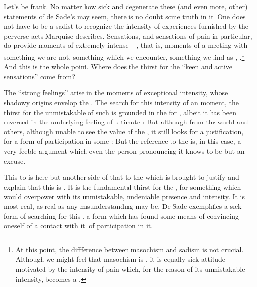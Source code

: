 {\subpa Let's be frank.  No matter how sick and degenerate these (and
even more, other) statements of de Sade's may seem, there is no doubt
some truth in it.  One does not have to be a sadist to recognize the
intensity of experiences furnished by the perverse acts Marquise
describes.  Sensations, and sensations of pain in particular, do
provide moments of extremely intense  --
, that is, moments of a meeting with something we are
not, something which we encounter, something we find as , .\footnote{At this point, the
diffference between masochism and sadism is not crucial.  Although we
might feel that masochism is , it is equally sick
attitude motivated by the intensity of pain which, for the reason of
its unmistakable intensity, becomes a .} And this is the whole point.  Where does the thirst for the
``keen and active sensations'' come from?

The ``strong
feelings'' arise in the moments of exceptional intensity, whose
shadowy origins envelop the .  The search for this intensity
of an  moment, the thirst for the unmistakable 
of such  is grounded in the  for
, albeit it has been reversed in the underlying
feeling of ultimate :
But although  from the world and others,
although unable to see the value of the 
, it still looks for a justification, for a form of
participation in some :
But the reference to the  is, in this
case, a very feeble argument which even the person pronouncing it
knows to be but an excuse.



\pa 
This  to  is here but another side of that 
 to the  which is brought to justify and 
explain that this is .
It is the fundamental thirst for the , 
for something which would overpower  with its unmistakable, 
undeniable presence and intensity. It is most real, as real as any 
misunderstanding may be.
De Sade exemplifies a sick form of searching for this , a 
form which has found some  means of convincing oneself of a 
contact with it, of participation in it. 

}
